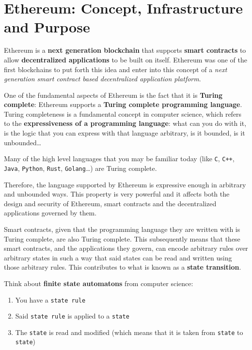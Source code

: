 \section{Ethereum: Concept, Infrastructure and
Purpose}\label{ethereum-concept-infrastructure-and-purpose}

Ethereum is a \textbf{next generation blockchain} that supports
\textbf{smart contracts} to allow \textbf{decentralized applications} to
be built on itself. Ethereum was one of the first blockchains to put
forth this idea and enter into this concept of a \emph{next generation
smart contract based decentralized application platform}.

One of the fundamental aspects of Ethereum is the fact that it is
\textbf{Turing complete}: Ethereum supports a \textbf{Turing complete
programming language}. Turing completeness is a fundamental concept in
computer science, which refers to the \textbf{expressiveness of a
programming language}: what can you do with it, is the logic that you
can express with that language arbitrary, is it bounded, is it
unbounded\ldots{}

Many of the high level languages that you may be familiar today (like
\texttt{C}, \texttt{C++}, \texttt{Java}, \texttt{Python}, \texttt{Rust},
\texttt{Golang}\ldots) are Turing complete.

Therefore, the language supported by Ethereum is expressive enough in
arbitrary and unbounded ways. This property is very powerful and it
affects both the design and security of Ethereum, smart contracts and
the decentralized applications governed by them.

Smart contracts, given that the programming language they are written
with is Turing complete, are also Turing complete. This subsequently
means that these smart contracts, and the applications they govern, can
encode arbitrary rules over arbitrary states in such a way that said
states can be read and written using those arbitrary rules. This
contributes to what is known as a \textbf{state transition}.

Think about \textbf{finite state automatons} from computer science:

\begin{enumerate}
\def\labelenumi{\arabic{enumi}.}
\tightlist
\item
  You have a \texttt{state\ rule}
\item
  Said \texttt{state\ rule} is applied to a \texttt{state}
\item
  The \texttt{state} is read and modified (which means that it is taken
  from \texttt{state} to \texttt{state\textquotesingle{}})
\end{enumerate}

